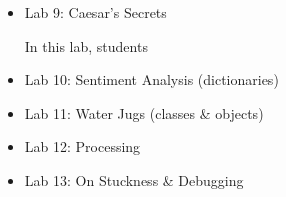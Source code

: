 \documentclass{article}
\begin{document}
\begin{itemize}
\item Lab 9: Caesar's Secrets

  In this lab, students
\item Lab 10: Sentiment Analysis (dictionaries)
\item Lab 11: Water Jugs (classes \& objects)
\item Lab 12: Processing
\item Lab 13: On Stuckness \& Debugging
\end{itemize}
\end{document}
